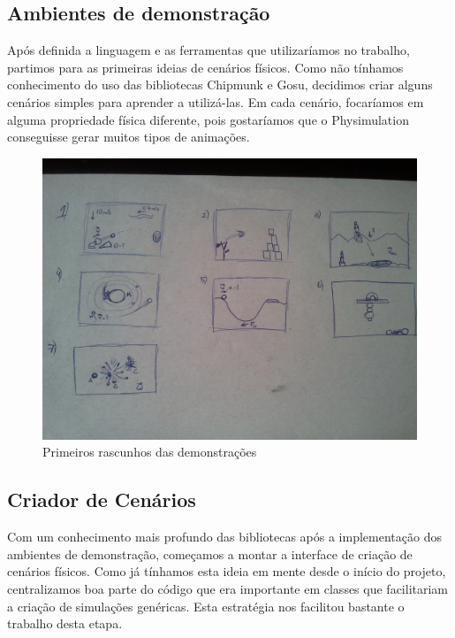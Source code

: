 \subsection{Ambientes de demonstração}
Após definida a linguagem e as ferramentas que utilizaríamos no trabalho, partimos para as primeiras ideias de cenários físicos. Como não tínhamos conhecimento do uso das bibliotecas Chipmunk e Gosu, decidimos criar alguns cenários simples para aprender a utilizá-las. Em cada cenário, focaríamos em alguma propriedade física diferente, pois gostaríamos que o Physimulation conseguisse gerar muitos tipos de animações. 

\begin{figure}[H]
	\centering
	\includegraphics[scale=0.2]{images/tcc-demos.jpg}
	\caption{Primeiros rascunhos das demonstrações}
\end{figure}

\subsection{Criador de Cenários}
Com um conhecimento mais profundo das bibliotecas após a implementação dos ambientes de demonstração, começamos a montar a interface de criação de cenários físicos. Como já tínhamos esta ideia em mente desde o início do projeto, centralizamos boa parte do código que era importante em classes que facilitariam a criação de simulações genéricas. Esta estratégia nos facilitou bastante o trabalho desta etapa.\\

